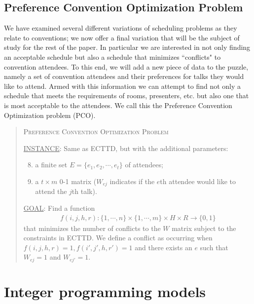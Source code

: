 \documentclass[]{article}
\theoremstyle{definition}
\theoremstyle{remark}
\numberwithin{equation}{section}
\begin{document}
\subsection{Preference Convention Optimization Problem}
We have examined several different variations of scheduling problems as they relate to conventions; we now offer a final variation that will be the subject of study for the rest of the paper. In particular we are interested in not only finding an acceptable schedule but also a schedule that minimizes ``conflicts" to convention attendees. To this end, we will add a new piece of data to the puzzle, namely a set of convention attendees and their preferences for talks they would like to attend. Armed with this information we can attempt to find not only a schedule that meets the requirements of rooms, presenters, etc. but also one that is most acceptable to the attendees. We call this the Preference Convention Optimization problem (PCO).
\begin{quote}
	\textsc{Preference Convention Optimization Problem}
	
	\underline{INSTANCE}: Same as ECTTD, but with the additional parameters:
	\begin{enumerate}[1.]
		\setcounter{enumi}{7}
		\item a finite set $E = \{e_1, e_2, \cdots, e_t\}$ of attendees;
		\item a $t \times m$ 0-1 matrix ($W_{ej}$ indicates if the $e$th attendee would like to attend the $j$th talk).
	\end{enumerate}
	
	\underline{GOAL}: Find a function 
	\begin{gather*}
		f(i,j,h,r) : \{1,\cdots,n\} \times \{1,\cdots,m\} \times H \times R \rightarrow \{0,1\}
	\end{gather*}
	that minimizes the number of conflicts to the $W$ matrix subject to the constraints in ECTTD. We define a conflict as occurring when $f(i,j,h,r)=1, f(i',j',h,r')=1$ and there exists an $e$ such that $W_{ej}=1$ and $W_{ej'}=1$.
\end{quote}

\section{Integer programming models}
\end{document}
